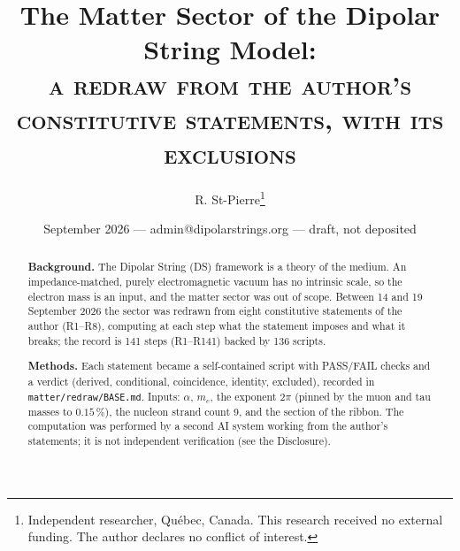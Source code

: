 \documentclass[11pt,a4paper]{article}
\title{\textbf{The Matter Sector of the Dipolar String Model:}\\ \large \textsc{a redraw from the author's constitutive statements, with its exclusions}}
\author{R. St-Pierre\thanks{Independent researcher, Qu\'ebec, Canada. This research received no external funding. The author declares no conflict of interest.}}
\date{September 2026 --- admin@dipolarstrings.org --- draft, not deposited}
\theoremstyle{plain}
\theoremstyle{remark}
\begin{document}
\maketitle

\begin{abstract}
\noindent\textbf{Background.} The Dipolar String (DS) framework is a theory of the medium. An
impedance-matched, purely electromagnetic vacuum has no intrinsic scale, so the electron mass is
an input, and the matter sector was out of scope. Between 14 and 19 September 2026 the sector was
redrawn from eight constitutive statements of the author (R1--R8), computing at each step what the
statement imposes and what it breaks; the record is 141 steps (R1--R141) backed by 136 scripts.

\noindent\textbf{Methods.} Each statement became a self-contained script with PASS/FAIL checks and
a verdict (derived, conditional, coincidence, identity, excluded), recorded in
\texttt{matter/redraw/BASE.md}. Inputs: $\alpha$, $m_e$, the exponent $2\pi$ (pinned by the muon
and tau masses to $0.15\,\%$), the nucleon strand count 9, and the section of the ribbon. The
computation was performed by a second AI system working from the author's statements; it is not
independent verification (see the Disclosure).


\end{abstract}
\end{document}
